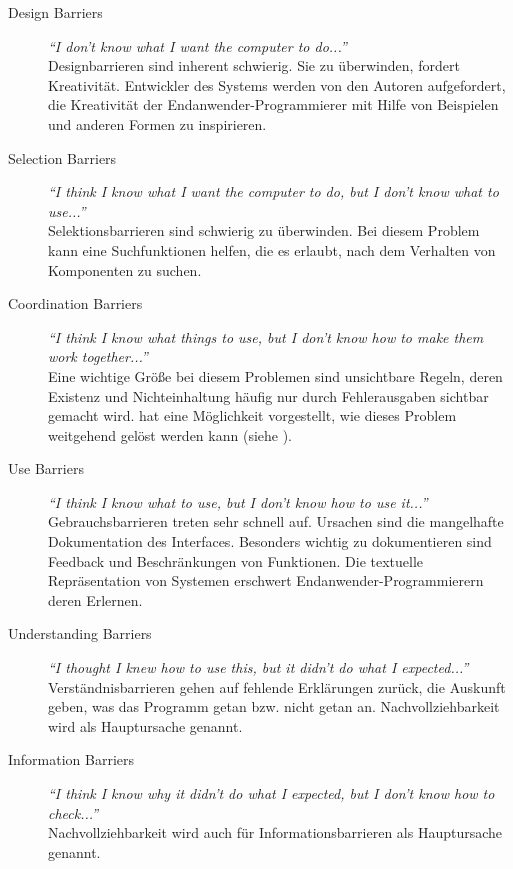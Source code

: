 \begin{description}
\item[Design Barriers] \textit{``I don’t know what I want the computer to do...''} \hfill \\
  Designbarrieren sind inherent schwierig. Sie zu überwinden, fordert Kreativität. Entwickler des Systems werden von den Autoren aufgefordert, die Kreativität der Endanwender-Programmierer mit Hilfe von Beispielen und anderen Formen zu inspirieren.
\item[Selection Barriers] \textit{``I think I know what I want the computer to do, but I don’t know what to use...''} \hfill \\
  Selektionsbarrieren sind schwierig zu überwinden. Bei diesem Problem kann eine Suchfunktionen helfen, die es erlaubt, nach dem Verhalten von Komponenten zu suchen.
\item[Coordination Barriers] \textit{``I think I know what things to use, but I don't know how to make them work together...''} \hfill \\
  Eine wichtige Größe bei diesem Problemen sind unsichtbare Regeln, deren Existenz und Nichteinhaltung häufig nur durch Fehlerausgaben sichtbar gemacht wird. \cite{dekel2011increasing} hat eine Möglichkeit vorgestellt, wie dieses Problem weitgehend gelöst werden kann (siehe ).
\item[Use Barriers] \textit{``I think I know what to use, but I don't know how to use it...''} \hfill \\
  Gebrauchsbarrieren treten sehr schnell auf. Ursachen sind die mangelhafte Dokumentation des Interfaces. Besonders wichtig zu dokumentieren sind Feedback und Beschränkungen von Funktionen. Die textuelle Repräsentation von Systemen erschwert Endanwender-Programmierern deren Erlernen.
\item[Understanding Barriers] \textit{``I thought I knew how to use this, but it didn’t do what I expected...''} \hfill \\
  Verständnisbarrieren gehen auf fehlende Erklärungen zurück, die Auskunft geben, was das Programm getan bzw. nicht getan an. Nachvollziehbarkeit wird als Hauptursache genannt.
\item[Information Barriers] \textit{``I think I know why it didn’t do what I expected, but I don’t know how to check...''} \hfill \\
  Nachvollziehbarkeit wird auch für Informationsbarrieren als Hauptursache genannt.
\end{description}

